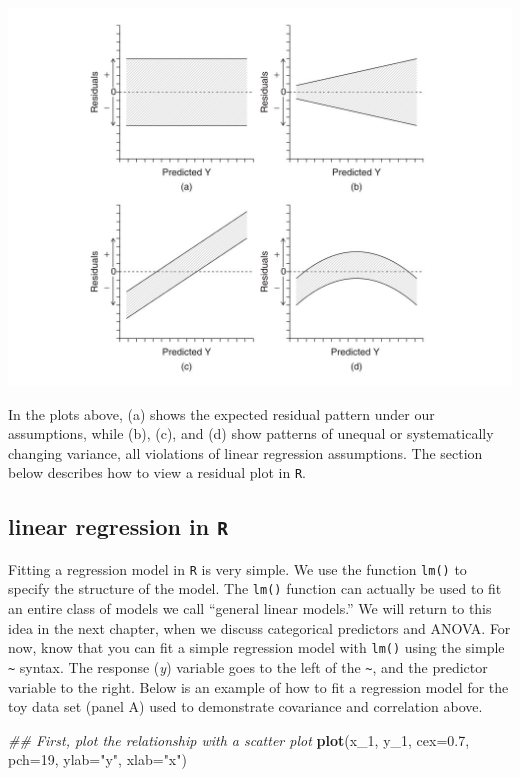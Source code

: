 \documentclass[]{book}
\newenvironment{Shaded}{\begin{snugshade}}{\end{snugshade}}
\newcommand{\CommentTok}[1]{\textcolor[rgb]{0.56,0.35,0.01}{\textit{#1}}}
\newcommand{\DataTypeTok}[1]{\textcolor[rgb]{0.13,0.29,0.53}{#1}}
\newcommand{\DecValTok}[1]{\textcolor[rgb]{0.00,0.00,0.81}{#1}}
\newcommand{\FloatTok}[1]{\textcolor[rgb]{0.00,0.00,0.81}{#1}}
\newcommand{\KeywordTok}[1]{\textcolor[rgb]{0.13,0.29,0.53}{\textbf{#1}}}
\newcommand{\NormalTok}[1]{#1}
\newcommand{\StringTok}[1]{\textcolor[rgb]{0.31,0.60,0.02}{#1}}
\begin{document}
\begin{center}\includegraphics[width=14.22in]{images/images_4b.018} \end{center}

In the plots above, (a) shows the expected residual pattern under our assumptions, while (b), (c), and (d) show patterns of unequal or systematically changing variance, all violations of linear regression assumptions. The section below describes how to view a residual plot in \texttt{R}.

\hypertarget{linear-regression-in-r}{%
\subsection{\texorpdfstring{linear regression in \texttt{R}}{linear regression in R}}\label{linear-regression-in-r}}

Fitting a regression model in \texttt{R} is very simple. We use the function \texttt{lm()} to specify the structure of the model. The \texttt{lm()} function can actually be used to fit an entire class of models we call ``general linear models.'' We will return to this idea in the next chapter, when we discuss categorical predictors and ANOVA. For now, know that you can fit a simple regression model with \texttt{lm()} using the simple \texttt{\textasciitilde{}} syntax. The response (\emph{y}) variable goes to the left of the \texttt{\textasciitilde{}}, and the predictor variable to the right. Below is an example of how to fit a regression model for the toy data set (panel A) used to demonstrate covariance and correlation above.

\begin{Shaded}
\begin{Highlighting}[]
\CommentTok{## First, plot the relationship with a scatter plot}
\KeywordTok{plot}\NormalTok{(x_}\DecValTok{1}\NormalTok{, y_}\DecValTok{1}\NormalTok{, }\DataTypeTok{cex=}\FloatTok{0.7}\NormalTok{, }\DataTypeTok{pch=}\DecValTok{19}\NormalTok{, }\DataTypeTok{ylab=}\StringTok{"y"}\NormalTok{, }\DataTypeTok{xlab=}\StringTok{"x"}\NormalTok{)}
\end{Highlighting}
\end{Shaded}
\end{document}
